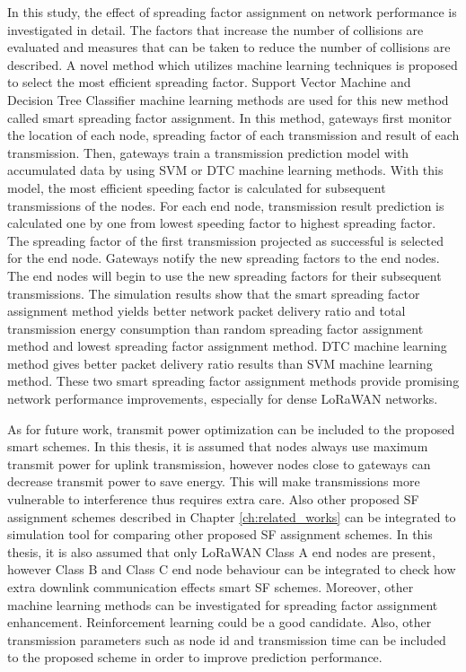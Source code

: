 In this study, the effect of spreading factor assignment on network performance is investigated in detail. The factors that increase the number of collisions are evaluated and measures that can be taken to reduce the number of collisions are described. A novel method which utilizes machine learning techniques is proposed to select the most efficient spreading factor. Support Vector Machine and Decision Tree Classifier machine learning methods are used for this new method called smart spreading factor assignment. In this method, gateways first monitor the location of each node, spreading factor of each transmission and result of each transmission. Then, gateways train a transmission prediction model with accumulated data by using SVM or DTC machine learning methods. With this model, the most efficient speeding factor is calculated for subsequent transmissions of the nodes. For each end node, transmission result prediction is calculated one by one from lowest speeding factor to highest spreading factor. The spreading factor of the first transmission projected as successful is selected for the end node. Gateways notify the new spreading factors to the end nodes. The end nodes will begin to use the new spreading factors for their subsequent transmissions. The simulation results show that the smart spreading factor assignment method yields better network packet delivery ratio and total transmission energy consumption than random spreading factor assignment method and lowest spreading factor assignment method. DTC machine learning method gives better packet delivery ratio results than SVM machine learning method. These two smart spreading factor assignment methods provide promising network performance improvements, especially for dense LoRaWAN networks.

As for future work, transmit power optimization can be included to the proposed smart schemes. In this thesis, it is assumed that nodes always use maximum transmit power for uplink transmission, however nodes close to gateways can decrease transmit power to save energy. This will make transmissions more vulnerable to interference thus requires extra care. Also other proposed SF assignment schemes described in Chapter \ref{ch:related_works} can be integrated to simulation tool for comparing other proposed SF assignment schemes. In this thesis, it is also assumed that only LoRaWAN Class A end nodes are present, however Class B and Class C end node behaviour can be integrated to check how extra downlink communication effects smart SF schemes. Moreover, other machine learning methods can be investigated for spreading factor assignment enhancement. Reinforcement learning could be a good candidate. Also, other transmission parameters such as node id and transmission time can be included to the proposed scheme in order to improve prediction performance.
